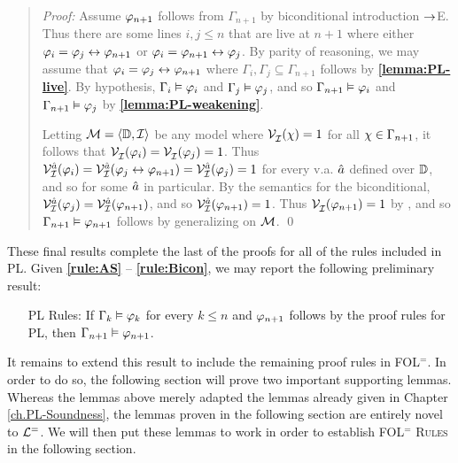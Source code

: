 
\begin{quote} 
  \textit{Proof:} Assume $\varphi_{n+1}$ follows from $\Gamma_{n+1}$ by biconditional introduction $\rightarrow$E.
Thus there are some lines $i,j\leq n$ that are live at $n+1$ where either $\varphi_i=\varphi_j\leftrightarrow\varphi_{n+1}$ or $\varphi_i=\varphi_{n+1}\leftrightarrow\varphi_j$.
  By parity of reasoning, we may assume that $\varphi_i=\varphi_j\leftrightarrow\varphi_{n+1}$ where $\Gamma_i,\Gamma_j\subseteq\Gamma_{n+1}$ follows by \textbf{\ref{lemma:PL-live}}.
  By hypothesis, $\Gamma_i\vDash \varphi_i$ and $\Gamma_j\vDash \varphi_j$, and so $\Gamma_{n+1} \vDash \varphi_i$ and $\Gamma_{n+1} \vDash \varphi_j$ by \textbf{\ref{lemma:PL-weakening}}.

  Letting $\mathcal{M}=\langle\mathbb{D},\mathcal{I}\rangle$ be any model where $\mathcal{V}_{\mathcal{I}}^{}(\chi) = 1$ for all $\chi \in \Gamma_{n+1}$, it follows that $\mathcal{V}_{\mathcal{I}}^{}(\varphi_i) = \mathcal{V}_{\mathcal{I}}^{}(\varphi_j) = 1$.
  Thus $\mathcal{V}_{\mathcal{I}}^{\hat{a}}(\varphi_i)=\mathcal{V}_{\mathcal{I}}^{\hat{a}}(\varphi_j\leftrightarrow\varphi_{n+1})=\mathcal{V}_{\mathcal{I}}^{\hat{a}}(\varphi_j)=1$ for every v.a. $\hat{a}$ defined over $\mathbb{D}$, and so for some $\hat{a}$ in particular. 
  By the semantics for the biconditional, $\mathcal{V}_{\mathcal{I}}^{\hat{a}}(\varphi_j)=\mathcal{V}_{\mathcal{I}}^{\hat{a}}(\varphi_{n+1})$, and so $\mathcal{V}_{\mathcal{I}}^{\hat{a}}(\varphi_{n+1})=1$.
  Thus $\mathcal{V}_{\mathcal{I}}^{}(\varphi_{n+1})=1$ by , and so $\Gamma_{n+1} \vDash \varphi_{n+1}$ follows by generalizing on $\mathcal{M}$.
  \qed
\end{quote}

These final results complete the last of the proofs for all of the rules included in PL.
Given \textbf{\ref{rule:AS}} -- \textbf{\ref{rule:Bicon}}, we may report the following preliminary result:

\begin{enumerate}[leftmargin=1.3in]
  \item[\sc PL Rules:] If $\Gamma_k \vDash \varphi_k$ for every $k\leq n$ and $\varphi_{n+1}$ follows by the proof rules for PL, then $\Gamma_{n+1} \vDash \varphi_{n+1}$.
\end{enumerate}

It remains to extend this result to include the remaining proof rules in FOL$^=$.
In order to do so, the following section will prove two important supporting lemmas.
Whereas the lemmas above merely adapted the lemmas already given in Chapter \ref{ch.PL-Soundness}, the lemmas proven in the following section are entirely novel to $\mathcal{L}^{=}$.
We will then put these lemmas to work in order to establish \textsc{FOL$^=$ Rules} in the following section.



